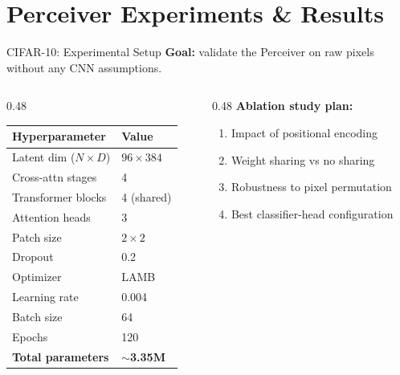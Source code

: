 \documentclass[aspectratio=169,11pt]{beamer}
\begin{document}
\section{Perceiver Experiments \& Results}

\begin{frame}[shrink=5]{CIFAR-10: Experimental Setup}
  \textbf{Goal:} validate the Perceiver on raw pixels without any CNN assumptions.

  \vspace{0.3em}
  \begin{columns}[T]
    \begin{column}{0.48\textwidth}
      \begin{table}
        \centering\small
        \begin{tabular}{ll}
          \toprule
          \textbf{Hyperparameter} & \textbf{Value} \\
          \midrule
          Latent dim ($N \times D$) & $96 \times 384$ \\
          Cross-attn stages & 4 \\
          Transformer blocks & 4 (shared) \\
          Attention heads & 3 \\
          Patch size & $2 \times 2$ \\
          Dropout & 0.2 \\
          \midrule
          Optimizer & LAMB \\
          Learning rate & 0.004 \\
          Batch size & 64 \\
          Epochs & 120 \\
          \midrule
          \textbf{Total parameters} & \textbf{$\sim$3.35M} \\
          \bottomrule
        \end{tabular}
      \end{table}
    \end{column}
    \begin{column}{0.48\textwidth}
      \textbf{Ablation study plan:}
      \begin{enumerate}
        \item Impact of positional encoding
        \item Weight sharing vs no sharing
        \item Robustness to pixel permutation
        \item Best classifier-head configuration
      \end{enumerate}


\end{column}
\end{columns}
\end{frame}
\end{document}
